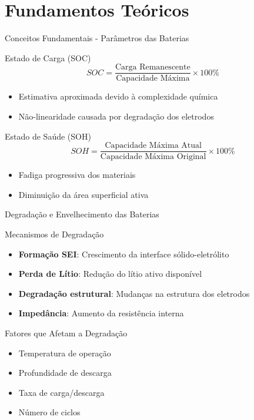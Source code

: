 \documentclass[aspectratio=169,xcolor=dvipsnames]{beamer}
\begin{document}
\section{Fundamentos Teóricos}
\begin{frame}{Conceitos Fundamentais - Parâmetros das Baterias}
  \begin{block}{Estado de Carga (SOC)}
    $$SOC = \frac{\text{Carga Remanescente}}{\text{Capacidade Máxima}} \times 100\%$$
    \begin{itemize}
      \item Estimativa aproximada devido à complexidade química
      \item Não-linearidade causada por degradação dos eletrodos
    \end{itemize}
  \end{block}
  
  \begin{block}{Estado de Saúde (SOH)}
    $$SOH = \frac{\text{Capacidade Máxima Atual}}{\text{Capacidade Máxima Original}} \times 100\%$$
    \begin{itemize}
      \item Fadiga progressiva dos materiais
      \item Diminuição da área superficial ativa
    \end{itemize}
  \end{block}
\end{frame}

\begin{frame}{Degradação e Envelhecimento das Baterias}
  \begin{alertblock}{Mecanismos de Degradação}
    \begin{itemize}
      \item \textbf{Formação SEI}: Crescimento da interface sólido-eletrólito
      \item \textbf{Perda de Lítio}: Redução do lítio ativo disponível
      \item \textbf{Degradação estrutural}: Mudanças na estrutura dos eletrodos
      \item \textbf{Impedância}: Aumento da resistência interna
    \end{itemize}
  \end{alertblock}
  
  \vspace{0.3cm}
  
  \begin{exampleblock}{Fatores que Afetam a Degradação}
    \begin{itemize}
      \item Temperatura de operação
      \item Profundidade de descarga
      \item Taxa de carga/descarga
      \item Número de ciclos
    \end{itemize}
  \end{exampleblock}
\end{frame}
\end{document}
